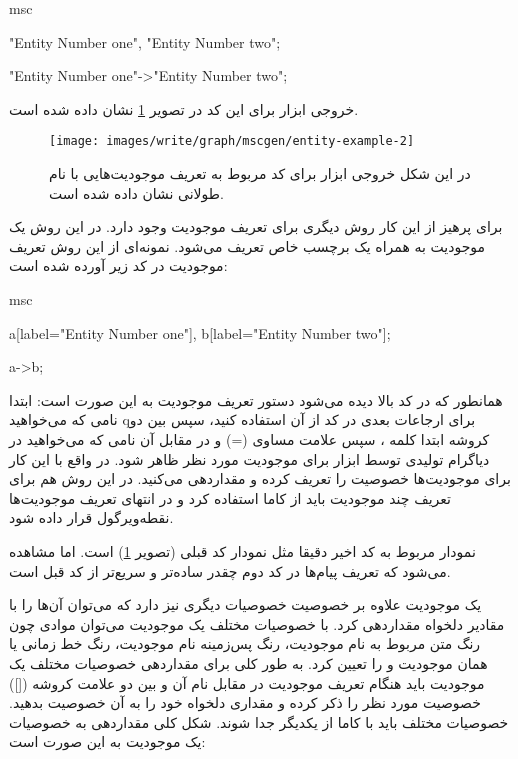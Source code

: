 \begin{MSC}
msc {
	"Entity Number one", "Entity Number two";
	
	"Entity Number one"->"Entity Number two";
}
\end{MSC}

خروجی ابزار  برای این کد در تصویر
\ref{images/write/graph/mscgen/entity-example-2} نشان داده شده است.

\begin{figure}[h]
	\centering
	\texttt{[image: images/write/graph/mscgen/entity-example-2]}
	\caption[مثالی از نحوه تعریف موجودیت‌هایی با نام‌های طولانی و حاوی خط فاصله]
	{در این شکل خروجی ابزار  برای کد مربوط به تعریف موجودیت‌هایی با نام طولانی نشان داده شده است.}
	\label{images/write/graph/mscgen/entity-example-2}
\end{figure}

برای پرهیز از این کار روش دیگری برای تعریف موجودیت وجود دارد. در این روش یک
موجودیت به همراه یک برچسب خاص تعریف می‌شود. نمونه‌ای از این روش تعریف موجودیت در
کد زیر آورده شده است:

\begin{MSC}
msc {
	a[label="Entity Number one"], b[label="Entity Number two"];
	
	a->b;
}
\end{MSC}

همانطور که در کد بالا دیده می‌شود دستور تعریف موجودیت به این صورت است: ابتدا
نامی که می‌خواهید qبرای ارجاعات بعدی در کد از آن استفاده کنید، سپس بین دو کروشه
ابتدا کلمه ، سپس علامت مساوی (=) و در مقابل آن نامی که می‌خواهید در
دیاگرام تولیدی توسط ابزار  برای موجودیت مورد نظر ظاهر شود. در واقع با
این کار برای موجودیت‌ها خصوصیت  را تعریف کرده و مقداردهی می‌کنید. در این
روش هم برای تعریف چند موجودیت باید از کاما استفاده کرد و در انتهای تعریف
موجودیت‌ها نقطه‌ویرگول قرار داده شود.

نمودار مربوط به کد اخیر دقیقا مثل نمودار کد قبلی (تصویر
\ref{images/write/graph/mscgen/entity-example-2}) است. اما مشاهده می‌شود که
تعریف پیام‌ها در کد دوم چقدر ساده‌تر و سریع‌تر از کد قبل است.

یک موجودیت علاوه بر خصوصیت  خصوصیات دیگری نیز دارد که می‌توان آن‌ها را با
مقادیر دلخواه مقداردهی کرد. با خصوصیات مختلف یک موجودیت می‌توان موادی چون رنگ متن
مربوط به نام موجودیت، رنگ پس‌زمینه نام موجودیت، رنگ خط زمانی یا همان
 موجودیت و \lr{\ldots} را تعیین کرد. به طور کلی برای مقداردهی
خصوصیات مختلف یک موجودیت باید هنگام تعریف موجودیت در مقابل نام آن و بین دو علامت کروشه
([]) خصوصیت مورد نظر را ذکر کرده و مقداری دلخواه خود را به آن خصوصیت بدهید. خصوصیات مختلف
باید با کاما از یکدیگر جدا شوند. شکل کلی مقداردهی به خصوصیات یک موجودیت به این صورت
است:

